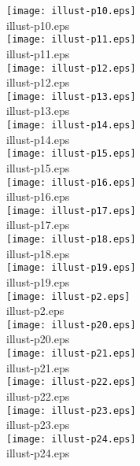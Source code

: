\texttt{[image: illust-p10.eps]}\\illust-p10.eps\\


\texttt{[image: illust-p11.eps]}\\illust-p11.eps\\


\texttt{[image: illust-p12.eps]}\\illust-p12.eps\\


\texttt{[image: illust-p13.eps]}\\illust-p13.eps\\


\texttt{[image: illust-p14.eps]}\\illust-p14.eps\\


\texttt{[image: illust-p15.eps]}\\illust-p15.eps\\


\texttt{[image: illust-p16.eps]}\\illust-p16.eps\\


\texttt{[image: illust-p17.eps]}\\illust-p17.eps\\


\texttt{[image: illust-p18.eps]}\\illust-p18.eps\\


\texttt{[image: illust-p19.eps]}\\illust-p19.eps\\


\texttt{[image: illust-p2.eps]}\\illust-p2.eps\\


\texttt{[image: illust-p20.eps]}\\illust-p20.eps\\


\texttt{[image: illust-p21.eps]}\\illust-p21.eps\\


\texttt{[image: illust-p22.eps]}\\illust-p22.eps\\


\texttt{[image: illust-p23.eps]}\\illust-p23.eps\\


\texttt{[image: illust-p24.eps]}\\illust-p24.eps\\


